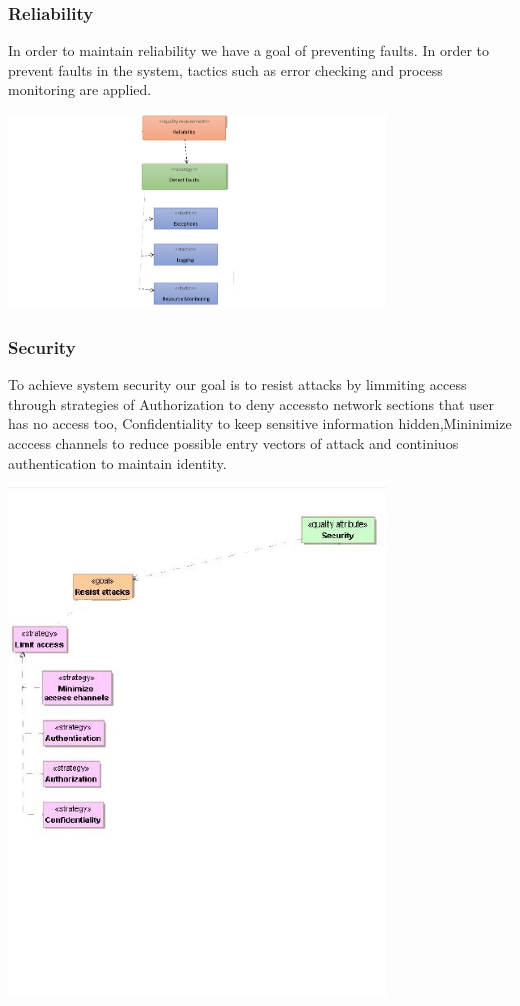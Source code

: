 \documentclass[a4paper,12pt]{report}
\begin{document}
		\subsubsection{Reliability}
		In order to maintain reliability we have a goal of preventing faults. In order to prevent faults in the
system, tactics such as error checking and process monitoring are applied.		

\includegraphics[width=10cm]{./reliabilityfigure.jpg}


		\subsubsection{Security}
		To achieve system security our goal is to resist attacks by limmiting access through strategies of Authorization to deny accessto network sections that user has no access too, Confidentiality to keep sensitive information hidden,Mininimize acccess channels to reduce possible entry vectors of attack and continiuos authentication to maintain identity.

\includegraphics[width=10cm]{./securityfigure.jpg}
	
\end{document}
